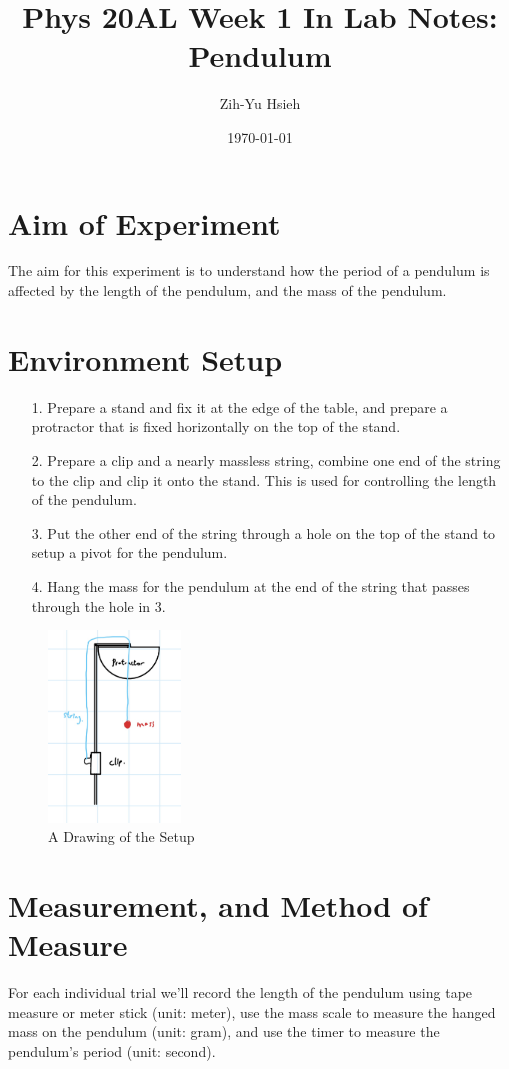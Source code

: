 \documentclass{article}
\title{Phys 20AL Week 1 In Lab Notes: Pendulum}
\author{Zih-Yu Hsieh}
\date{\today}
\begin{document}
\maketitle

\section{Aim of Experiment}
The aim for this experiment is to understand how the period of a pendulum is affected by the length of the pendulum, and the mass of the pendulum.

\section{Environment Setup}
\begin{itemize}
    \item[1.] Prepare a stand and fix it at the edge of the table, and prepare a protractor that is fixed horizontally on the top of the stand.
    \item[2.] Prepare a clip and a nearly massless string, combine one end of the string to the clip and clip it onto the stand. This is used for controlling the length of the pendulum.
    \item[3.] Put the other end of the string through a hole on the top of the stand to setup a pivot for the pendulum.
    \item[4.] Hang the mass for the pendulum at the end of the string that passes through the hole in 3.
\end{itemize}
\begin{figure}[h!]
    \begin{center}
        \includegraphics[width=100pt]{setup_sketch.png}
        \caption{A Drawing of the Setup}
    \end{center}
\end{figure}

\section{Measurement, and Method of Measure}
For each individual trial we'll record the length of the pendulum using tape measure or meter stick (unit: meter), use the mass scale to measure the hanged mass on the pendulum (unit: gram), and use the timer to measure the pendulum's period (unit: second).
\end{document}
